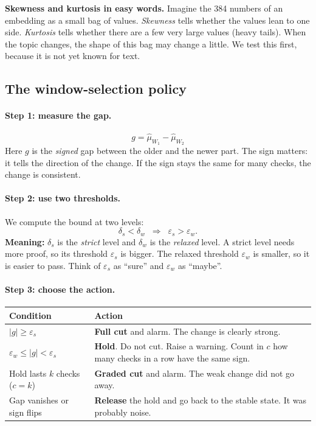 \documentclass[11pt,a4paper]{article}
\begin{document}
\textbf{Skewness and kurtosis in easy words.} Imagine the 384 numbers of an embedding as a small bag of values. \emph{Skewness} tells whether the values lean to one side. \emph{Kurtosis} tells whether there are a few very large values (heavy tails). When the topic changes, the shape of this bag may change a little. We test this first, because it is not yet known for text.

\subsection{The window-selection policy}

\paragraph{Step 1: measure the gap.}
\[
g=\hat\mu_{W_1}-\hat\mu_{W_2}
\]
Here $g$ is the \emph{signed} gap between the older and the newer part. The sign matters: it tells the direction of the change. If the sign stays the same for many checks, the change is consistent.

\paragraph{Step 2: use two thresholds.}
We compute the bound at two levels:
\[
\delta_s<\delta_w \;\;\Longrightarrow\;\; \varepsilon_s>\varepsilon_w .
\]
\textbf{Meaning:} $\delta_s$ is the \emph{strict} level and $\delta_w$ is the \emph{relaxed} level. A strict level needs more proof, so its threshold $\varepsilon_s$ is bigger. The relaxed threshold $\varepsilon_w$ is smaller, so it is easier to pass. Think of $\varepsilon_s$ as ``sure'' and $\varepsilon_w$ as ``maybe''.

\paragraph{Step 3: choose the action.}
\begin{center}
\begin{tabular}{@{}>{\centering\arraybackslash}p{3.8cm}p{9.5cm}@{}}
\toprule
Condition & Action \\
\midrule
$|g|\ge\varepsilon_s$ & \textbf{Full cut} and alarm. The change is clearly strong. \\
$\varepsilon_w\le|g|<\varepsilon_s$ & \textbf{Hold}. Do not cut. Raise a warning. Count in $c$ how many checks in a row have the same sign. \\
Hold lasts $k$ checks ($c=k$) & \textbf{Graded cut} and alarm. The weak change did not go away. \\
Gap vanishes or sign flips & \textbf{Release} the hold and go back to the stable state. It was probably noise. \\
\bottomrule
\end{tabular}
\end{center}
\end{document}
